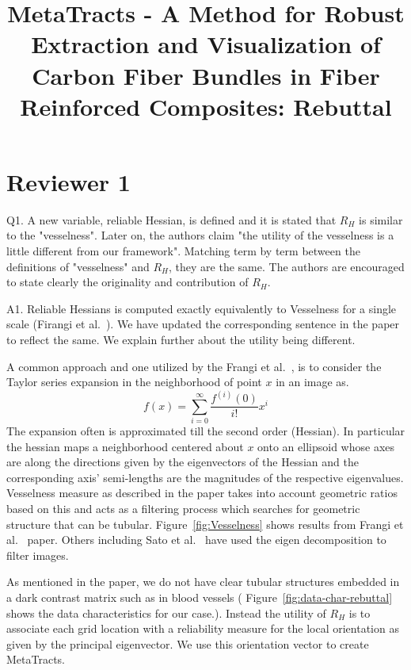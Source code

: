 \documentclass[]{article}
\title{MetaTracts - A Method for Robust Extraction and Visualization of Carbon Fiber Bundles in Fiber Reinforced Composites: Rebuttal}
\author{}
\begin{document}
\maketitle


\section{Reviewer 1}
\color{red}
Q1. A new variable, reliable Hessian, is defined and it is stated that $R_{H}$ is similar to the "vesselness".  Later on, the authors claim "the utility of the vesselness is a little different from our framework". Matching term by term between the definitions of "vesselness" and $R_{H}$, they are the same. The authors are encouraged to state clearly the originality and contribution of $R_{H}$.
\color{black}

A1. Reliable Hessians is computed exactly equivalently to Vesselness for a single scale (Firangi et al.~\cite{Frangi1998}). We have  updated the corresponding sentence in the paper to reflect the same. We explain further about the utility being different.


A common approach and one utilized by the Frangi et al.~\cite{Frangi1998}, is to consider the Taylor series expansion in the neighborhood of point $x$ in an image as.
\begin{equation}
f(x) = \sum_{i=0}^{\infty}\frac{f^{(i)}(0)}{i!}x^{i}
\end{equation}
The expansion often is approximated till the second order (Hessian). In particular the hessian maps a  neighborhood  centered about $x$ onto an ellipsoid  whose axes are along the directions given by the eigenvectors of the Hessian and the corresponding axis' semi-lengths are the magnitudes of the respective eigenvalues. Vesselness measure as described in the paper takes into account geometric ratios based on this and acts as a filtering process which searches for geometric structure that can be tubular. Figure~\ref{fig:Vesselness} shows results from Frangi et al.~\cite{Frangi1998} paper. Others including Sato et al.~\cite{Sato1997} have used the eigen decomposition to filter images.

As mentioned in the paper, we do not have clear tubular structures embedded in a dark contrast matrix such as in blood vessels ( Figure~\ref{fig:data-char-rebuttal} shows the data characteristics for our case.). Instead  the utility of $R_{H}$ is  to associate each grid location with a reliability measure for the local orientation as given by the  principal eigenvector. We use this orientation vector to create MetaTracts.
\end{document}
